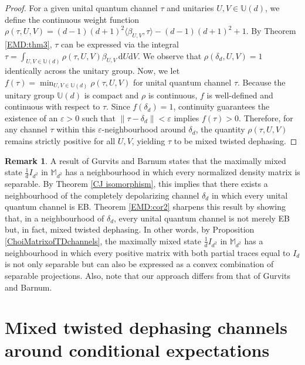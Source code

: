 \documentclass[11pt,reqno]{amsart}
\theoremstyle{definition}
\newtheorem{rmk}[defn]{Remark}
\theoremstyle{plain}
\theoremstyle{remark}
\numberwithin{equation}{section}%
\begin{document}
\begin{proof}
	For a given unital quantum channel $\tau$ and unitaries $U, V \in \mathbb{U}(d)$, we define the continuous weight function $\rho(\tau, U, V) = (d-1)(d+1)^2 \langle \beta_{U,V}, \tau \rangle - (d-1)(d+1)^2 + 1$. By Theorem \ref{EMD:thm3}, $\tau$ can be expressed via the integral $\tau = \int_{U,V \in \mathbb{U}(d)} \rho(\tau, U, V) \beta_{U,V} \, \mathrm{d}U \mathrm{d}V$. We observe that $\rho(\delta_d, U, V) = 1$ identically across the unitary group. Now, we let $f(\tau) = \min_{U,V \in \mathbb{U}(d)} \rho(\tau, U, V)$ for unital quantum channel $\tau$. Because the unitary group $\mathbb{U}(d)$ is compact and $\rho$ is continuous, $f$ is well-defined and continuous with respect to $\tau$. Since $f(\delta_d) = 1$, continuity guarantees the existence of an $\varepsilon > 0$ such that $\|\tau - \delta_d\| < \varepsilon$ implies $f(\tau) > 0$. Therefore, for any channel $\tau$ within this $\varepsilon$-neighbourhood around $\delta_d$, the quantity $\rho(\tau, U, V)$ remains strictly positive for all $U,V$, yielding $\tau$ to be mixed twisted dephasing.
\end{proof}


\begin{rmk}
	A result of Gurvits and Barnum \cite[Corollary 3]{GB} states that the maximally mixed state $\frac{1}{d}I_{d^2}$ in $\mathbb{M}_{d^2}$ has a neighbourhood in which every normalized density matrix is separable. By Theorem \ref{CJ isomorphism}, this implies that there exists a neighbourhood of the completely depolarizing channel $\delta_d$ in which every unital quantum channel is EB. Theorem \ref{EMD:cor2} sharpens this result by showing that, in a neighbourhood of $\delta_d$, every unital quantum channel is not merely EB but, in fact, mixed twisted dephasing. In other words, by Proposition \ref{ChoiMatrixofTDchannels}, the maximally mixed state $\frac{1}{d}I_{d^2}$ in $\mathbb{M}_{d^2}$ has a neighbourhood in which every positive matrix with both partial traces equal to $I_d$ is not only separable but can also be expressed as a convex combination of separable projections. Also, note that our approach differs from that of Gurvits and Barnum.
\end{rmk}



\section{Mixed twisted dephasing channels around conditional expectations}\label{conditional expectation}
\end{document}
